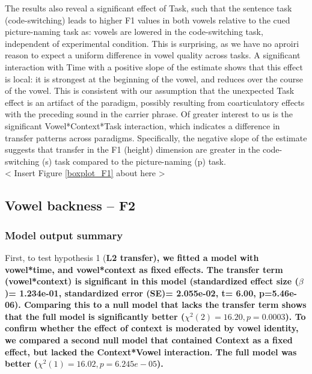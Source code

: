 \documentclass[12 pt]{article}
\begin{document}
The results also reveal a significant effect of Task, such that the sentence task (code-switching) leads to higher F1 values in both vowels relative to the cued picture-naming task as: vowels are lowered in the code-switching task, independent of experimental condition. This is surprising, as we have no aproiri reason to expect a uniform difference in vowel quality across tasks. A significant interaction with Time with a positive slope of the estimate shows that this effect is local: it is strongest at the beginning of the vowel, and reduces over the course of the vowel. This is consistent with our assumption that the unexpected Task effect is an artifact of the paradigm, possibly resulting from coarticulatory effects with the preceding sound in the carrier phrase. Of greater interest to us is the significant Vowel*Context*Task interaction, which indicates a difference in transfer patterns across paradigms. Specifically, the negative slope of the estimate suggests that transfer in the F1 (height) dimension are greater in the code-switching (s) task compared to the picture-naming (p) task.\\


< Insert Figure \ref{boxplot_F1} about here >\\


\subsection{Vowel backness -- F2}

\subsubsection*{Model output summary}

First, to test hypothesis 1 (\bf{L2 transfer}), we fitted a model with vowel*time, and vowel*context as fixed effects. The transfer term (vowel*context) is significant in this model (standardized effect size ($\beta$)= 1.234e-01, standardized error (SE)=  2.055e-02, t= 6.00, p=5.46e-06). Comparing this to a null model that lacks the transfer term shows that the full model is significantly better ($\chi^2(2) = 16.20, p= 0.0003$). To confirm whether the effect of context is moderated by vowel identity, we compared a second null model that contained Context as a fixed effect, but lacked the Context*Vowel interaction. The full model was better ($\chi^2(1) = 16.02, p= 6.245e-05$).
  
\end{document}
